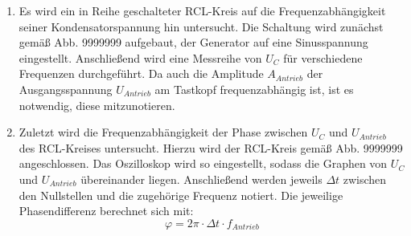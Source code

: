 \begin{enumerate}
      \item Es wird ein in Reihe geschalteter RCL-Kreis auf die Frequenzabhängigkeit seiner Kondensatorspannung hin untersucht.
      Die Schaltung wird zunächst gemäß Abb. 9999999 aufgebaut, der Generator auf eine Sinusspannung eingestellt.
      Anschließend wird eine Messreihe von $U_C$ für verschiedene Frequenzen durchgeführt.
       Da auch die Amplitude $A_{Antrieb}$ der Ausgangsspannung $U_{Antrieb}$ am Tastkopf frequenzabhängig ist, ist es notwendig, diese mitzunotieren.

         \item Zuletzt wird die Frequenzabhängigkeit der Phase zwischen $U_C$ und $U_{Antrieb}$ des
          RCL-Kreises untersucht. Hierzu wird der RCL-Kreis gemäß Abb. 9999999
          angeschlossen. Das Oszilloskop wird so eingestellt, sodass die Graphen von $U_C$ und $U_{Antrieb}$ übereinander liegen.
             Anschließend werden jeweils
      $\Delta t$ zwischen den Nullstellen und die zugehörige Frequenz notiert. Die jeweilige
       Phasendifferenz berechnet sich mit:
       \begin{equation}
         \varphi = 2 \pi \cdot \Delta t \cdot f_{Antrieb}
       \end{equation}
\end{enumerate}
